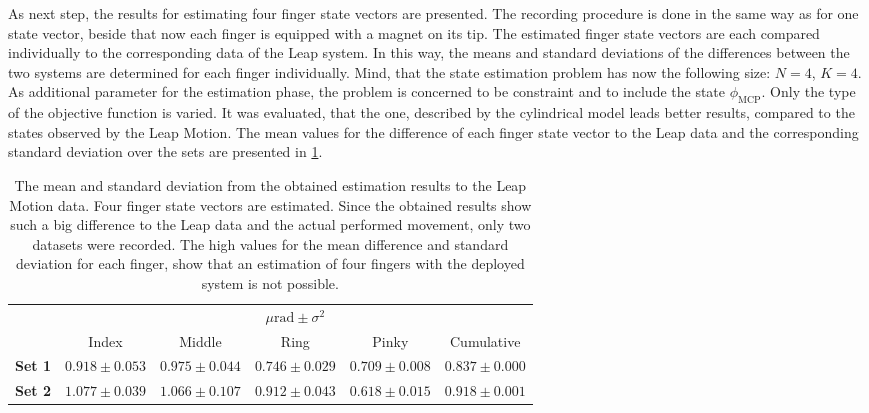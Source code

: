 As next step, the results for estimating four finger state vectors are presented. The recording procedure is done in the same way as for one state vector, beside that now each finger is equipped with a magnet on its tip. The estimated finger state vectors are each compared individually to the corresponding data of the Leap system. In this way, the means and standard deviations of the differences between the two systems are determined for each finger individually. Mind, that the state estimation problem has now the following size: $ N = 4 $, $ K = 4 $. As additional parameter for the estimation phase, the problem is concerned to be constraint and to include the state $ \phi_{\mathrm{MCP}} $. Only the type of the objective function is varied. It was evaluated, that the one, described by the cylindrical model leads better results, compared to the states observed by the Leap Motion. The mean values for the difference of each finger state vector to the Leap data and the corresponding standard deviation over the sets are presented in \ref{tab:estSetFour}.
\begin{table}[!htb]
\centering
\begin{tabular}{l c c c c c}
\toprule
&  \multicolumn{5}{c}{$ \mu \si{\radian} \pm \sigma^{2} $} \\ \cmidrule{2-6}
& 			   				 Index 				 & Middle 			   & Ring 				 & Pinky 			   &  Cumulative \\ \midrule
\textbf{Set 1} &  $ 0.918 \pm 0.053 $ & $ 0.975 \pm 0.044 $ & $ 0.746 \pm 0.029 $ & $ 0.709 \pm 0.008 $ & $ 0.837 \pm 0.000 $ \\ 
\textbf{Set 2} &  $ 1.077 \pm 0.039 $ & $ 1.066 \pm 0.107 $ & $ 0.912 \pm 0.043 $ & $ 0.618 \pm 0.015 $ & $ 0.918 \pm 0.001 $ \\ \bottomrule
\end{tabular}
\caption[Difference of estimated states, compared to Leap Motion data for four finger estimation]
{The mean and standard deviation from the obtained estimation results to the Leap Motion data. Four finger state vectors are estimated. Since the obtained results show such a big difference to the Leap data and the actual performed movement, only two datasets were recorded. The high values for the mean difference and standard deviation for each finger, show that an estimation of four fingers with the deployed system is not possible.}
\label{tab:estSetFour}
\end{table}
\FloatBarrier


